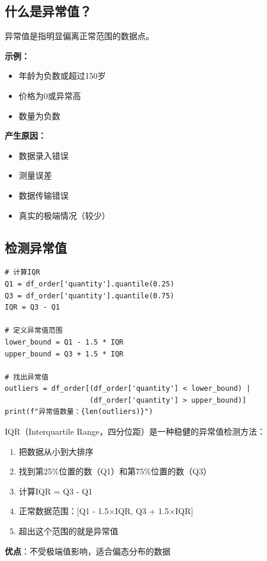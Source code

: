 \documentclass[12pt,a4paper]{article}
\begin{document}
\subsection{什么是异常值？}

\begin{knowledgebox}[异常值介绍]
异常值是指明显偏离正常范围的数据点。

\textbf{示例：}
\begin{itemize}
    \item 年龄为负数或超过150岁
    \item 价格为0或异常高
    \item 数量为负数
\end{itemize}

\textbf{产生原因：}
\begin{itemize}
    \item 数据录入错误
    \item 测量误差
    \item 数据传输错误
    \item 真实的极端情况（较少）
\end{itemize}
\end{knowledgebox}

\subsection{检测异常值}

\begin{lstlisting}[caption={使用IQR方法检测异常值}]
# 计算IQR
Q1 = df_order['quantity'].quantile(0.25)
Q3 = df_order['quantity'].quantile(0.75)
IQR = Q3 - Q1

# 定义异常值范围
lower_bound = Q1 - 1.5 * IQR
upper_bound = Q3 + 1.5 * IQR

# 找出异常值
outliers = df_order[(df_order['quantity'] < lower_bound) | 
                    (df_order['quantity'] > upper_bound)]
print(f"异常值数量：{len(outliers)}")
\end{lstlisting}

\begin{knowledgebox}
IQR（Interquartile Range，四分位距）是一种稳健的异常值检测方法：

\begin{enumerate}
    \item 把数据从小到大排序
    \item 找到第25\%位置的数（Q1）和第75\%位置的数（Q3）
    \item 计算IQR = Q3 - Q1
    \item 正常数据范围：[Q1 - 1.5×IQR, Q3 + 1.5×IQR]
    \item 超出这个范围的就是异常值
\end{enumerate}

\textbf{优点}：不受极端值影响，适合偏态分布的数据
\end{knowledgebox}
\end{document}

